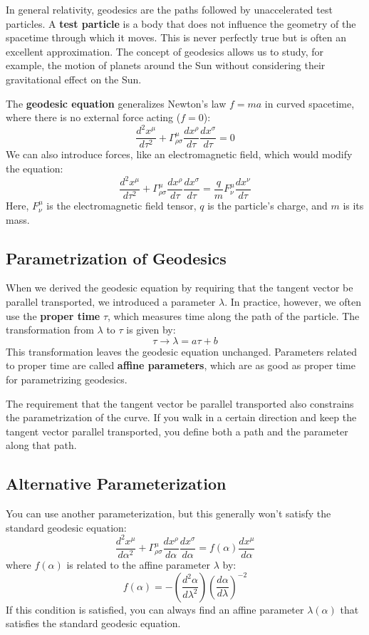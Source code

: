 \documentclass[12pt]{book}
\begin{document}
In general relativity, geodesics are the paths followed by unaccelerated test particles. A \textbf{test particle} is a body that does not influence the geometry of the spacetime through which it moves. This is never perfectly true but is often an excellent approximation. The concept of geodesics allows us to study, for example, the motion of planets around the Sun without considering their gravitational effect on the Sun.

The \textbf{geodesic equation} generalizes Newton's law \( f = ma \) in curved spacetime, where there is no external force acting (\( f = 0 \)):
\[
\frac{d^2 x^\mu}{d\tau^2} + \Gamma^\mu_{\rho\sigma} \frac{dx^\rho}{d\tau} \frac{dx^\sigma}{d\tau} = 0
\]
We can also introduce forces, like an electromagnetic field, which would modify the equation:
\[
\frac{d^2 x^\mu}{d\tau^2} + \Gamma^\mu_{\rho\sigma} \frac{dx^\rho}{d\tau} \frac{dx^\sigma}{d\tau} = \frac{q}{m} F^\mu_{\nu} \frac{dx^\nu}{d\tau}
\]
Here, \( F^\mu_{\nu} \) is the electromagnetic field tensor, \( q \) is the particle's charge, and \( m \) is its mass.

\subsection{Parametrization of Geodesics}

When we derived the geodesic equation by requiring that the tangent vector be parallel transported, we introduced a parameter \( \lambda \). In practice, however, we often use the \textbf{proper time} \( \tau \), which measures time along the path of the particle. The transformation from \( \lambda \) to \( \tau \) is given by:
\[
\tau \to \lambda = a\tau + b
\]
This transformation leaves the geodesic equation unchanged. Parameters related to proper time are called \textbf{affine parameters}, which are as good as proper time for parametrizing geodesics.

The requirement that the tangent vector be parallel transported also constrains the parametrization of the curve. If you walk in a certain direction and keep the tangent vector parallel transported, you define both a path and the parameter along that path.

\subsection{Alternative Parameterization}

You can use another parameterization, but this generally won’t satisfy the standard geodesic equation:
\[
\frac{d^2 x^\mu}{d\alpha^2} + \Gamma^\mu_{\rho\sigma} \frac{dx^\rho}{d\alpha} \frac{dx^\sigma}{d\alpha} = f(\alpha) \frac{dx^\mu}{d\alpha}
\]
where \( f(\alpha) \) is related to the affine parameter \( \lambda \) by:
\[
f(\alpha) = -\left( \frac{d^2 \alpha}{d\lambda^2} \right) \left( \frac{d\alpha}{d\lambda} \right)^{-2}
\]
If this condition is satisfied, you can always find an affine parameter \( \lambda(\alpha) \) that satisfies the standard geodesic equation.
\end{document}
